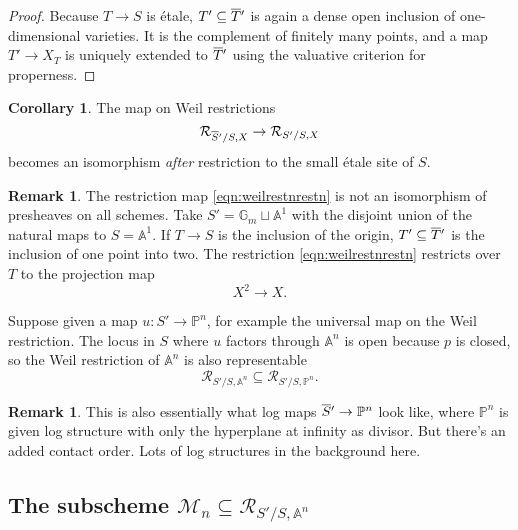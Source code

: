 \documentclass[11pt,reqno]{amsart}
\theoremstyle{definition}
\newtheorem{corollary}[theorem]{Corollary}
\newtheorem{remark}[theorem]{Remark}
\newcommand{\Aff}{{\mathbb{A}}}
\newcommand{\PP}{\mathbb{P}}
\newcommand{\GG}{\mathbb{G}}
\def\overnorm#1{\overline{#1}\vphantom{#1}}
\renewcommand{\bar}[1]{\ensuremath{\overnorm{#1}}}
\newcommand{\WR}{\cal R}
\newcommand{\Gen}{\cal M}
\newcommand{\cal}[1]{\ensuremath{\mathcal{#1}}}
\begin{document}
\begin{proof}

Because $T \to S$ is \'etale, $T' \subseteq \bar T'$ is again a dense open inclusion of one-dimensional varieties. It is the complement of finitely many points, and a map $T' \to X_T$ is uniquely extended to $\bar T'$ using the valuative criterion for properness. 


\end{proof}


\begin{corollary}

The map on Weil restrictions
\begin{equation}\label{eqn:weilrestnrestn}
	\WR_{\bar S'/S, X} \to \WR_{S'/S, X}
\end{equation}
becomes an isomorphism \emph{after} restriction to the small \'etale site of $S$. 

\end{corollary}



\begin{remark}

The restriction map \eqref{eqn:weilrestnrestn} is not an isomorphism of presheaves on all schemes. Take $S' = \GG_m \sqcup \Aff^1$ with the disjoint union of the natural maps to $S = \Aff^1$. If $T \to S$ is the inclusion of the origin, $T' \subseteq \bar T'$ is the inclusion of one point into two. The restriction \eqref{eqn:weilrestnrestn} restricts over $T$ to the projection map
\[X^2 \to X.\] 

\end{remark}


Suppose given a map $u : S' \to \PP^n$, for example the universal map on the Weil restriction. The locus in $S$ where $u$ factors through $\Aff^n$ is open because $p$ is closed, so the Weil restriction of $\Aff^n$ is also representable
\[\WR_{S'/S, \Aff^n} \subseteq \WR_{S'/S, \PP^n}.\]

\begin{remark}

This is also essentially what log maps $\bar S' \to \PP^n$ look like, where $\PP^n$ is given log structure with only the hyperplane at infinity as divisor. But there's an added contact order. Lots of log structures in the background here. 

\end{remark}




\subsection{The subscheme $\Gen_n \subseteq \WR_{S'/S, \Aff^n}$}
\end{document}
